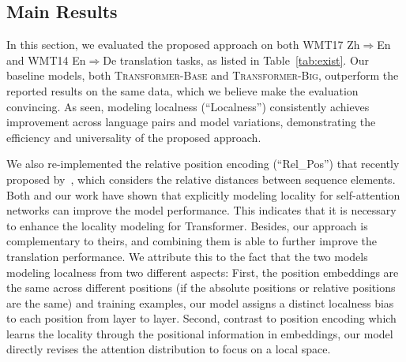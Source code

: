 \documentclass[11pt,a4paper]{article}
\begin{document}
\subsection{Main Results}

In this section, we evaluated the proposed approach on both WMT17 Zh$\Rightarrow$En and WMT14 En$\Rightarrow$De translation tasks, as listed in Table~\ref{tab:exist}. 
Our baseline models, both \textsc{Transformer-Base} and \textsc{Transformer-Big}, outperform the reported results on the same data, which we believe make the evaluation convincing. As seen, modeling localness (``Localness'') consistently achieves improvement across language pairs and model variations, demonstrating the efficiency and universality of the proposed  approach.

We also re-implemented the relative position encoding (``Rel\_Pos'') that recently proposed  by~, which considers the relative distances between sequence elements.
{Both  and our work have shown that explicitly modeling locality for self-attention networks can improve the model performance.} This indicates that it is necessary to enhance the locality modeling for Transformer. Besides, our approach is complementary to theirs, and combining them is able to further improve the translation performance. We attribute this to the fact that the two models modeling localness from two different aspects: { First, the position embeddings are the same across different positions (if the absolute positions or relative positions are the same) and training examples, our model assigns a distinct localness bias to each position from layer to layer. Second, contrast to position encoding which learns the locality through the positional information in embeddings, our model directly revises the attention distribution to focus on a local space. 
}
\end{document}

